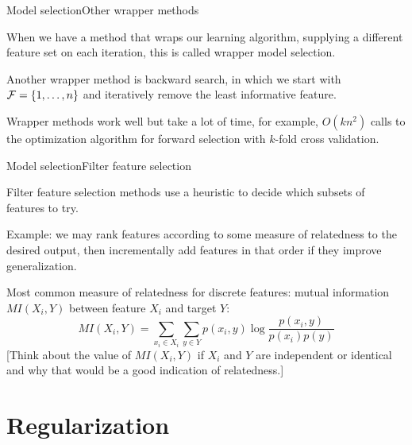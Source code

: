 \documentclass{beamer}
\begin{document}
\begin{frame}{Model selection}{Other wrapper methods}

  When we have a method that \alert{wraps} our learning algorithm,
  supplying a different feature set on each iteration, this is called
  \alert{wrapper model selection}.

  \medskip

  Another wrapper method is \alert{backward search}, in which we start
  with ${\cal F} = \{ 1, \ldots, n \}$ and \alert{iteratively remove
    the least informative feature}.

  \medskip

  Wrapper methods work well but take a lot of time, for example,
  $O(kn^2)$ calls to the optimization algorithm for forward selection
  with $k$-fold cross validation.
  
\end{frame}


\begin{frame}{Model selection}{Filter feature selection}

  \alert{Filter feature selection} methods use a heuristic to decide
  which subsets of features to try.
  
  \medskip

  Example: we may \alert{rank} features according to some measure of
  relatedness to the desired output, then incrementally add features
  in that order if they improve generalization.

  \medskip
  
  Most common measure of relatedness for discrete features:
  \alert{mutual information} $MI(X_i,Y)$ between feature $X_i$ and
  target $Y$:
  \[ MI(X_i,Y) = \sum_{x_i\in X_i} \sum_{y\in Y} p(x_i,y)\log\frac{p(x_i,y)}{p(x_i)p(y)} \]
  [Think about the value of $MI(X_i,Y)$ if $X_i$ and $Y$ are
    independent or identical and why that would be a good indication
    of relatedness.]

\end{frame}

\section{Regularization}
\end{document}
